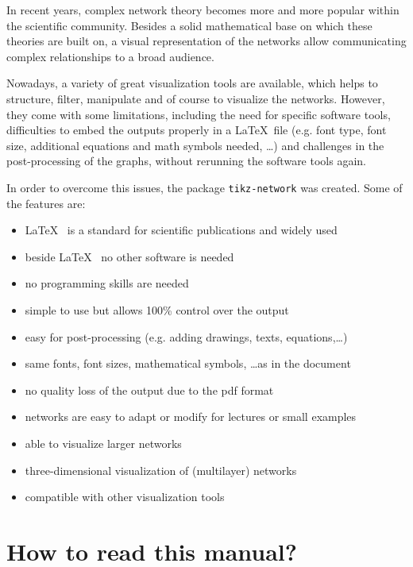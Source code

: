 \documentclass[a4paper,twosided,notoc]{tufte-book}
\newcommand{\doccls}[1]{\texttt{#1}}%
\newcommand{\pkg}{\doccls{tikz-network}\xspace}
\begin{document}
In recent years, complex network theory becomes more and more popular within the scientific community. Besides a solid mathematical base on which these theories are built on, a visual representation of the networks allow communicating complex relationships to a broad audience.

Nowadays, a variety of great visualization tools are available, which helps to structure, filter, manipulate and of course to visualize the networks. However, they come with some limitations, including the need for specific software tools, difficulties to embed the outputs properly in a \LaTeX~file (e.g. font type, font size, additional equations and math symbols needed, \dots) and challenges in the post-processing of the graphs, without rerunning the software tools again.

In order to overcome this issues, the package \pkg was created. Some of the features are:

\begin{itemize}
\item \LaTeX~ is a standard for scientific publications and widely used
\item beside \LaTeX~ no other software is needed
\item no programming skills are needed
\item simple to use but allows 100\% control over the output
\item easy for post-processing (e.g. adding drawings, texts, equations,\dots)
\item same fonts, font sizes, mathematical symbols, \dots as in the document
\item no quality loss of the output due to the pdf format
\item networks are easy to adapt or modify for lectures or small examples
\item able to visualize larger networks
\item three-dimensional visualization of (multilayer) networks
\item compatible with other visualization tools
\end{itemize}
\newpage

\section{How to read this manual?}
\end{document}

